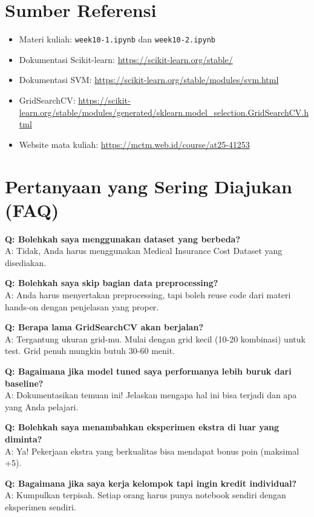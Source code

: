 \documentclass[12pt,a4paper]{article}
\begin{document}
\section{Sumber Referensi}

\begin{itemize}
    \item Materi kuliah: \texttt{week10-1.ipynb} dan \texttt{week10-2.ipynb}
    \item Dokumentasi Scikit-learn: \url{https://scikit-learn.org/stable/}
    \item Dokumentasi SVM: \url{https://scikit-learn.org/stable/modules/svm.html}
    \item GridSearchCV: \url{https://scikit-learn.org/stable/modules/generated/sklearn.model_selection.GridSearchCV.html}
    \item Website mata kuliah: \url{https://mctm.web.id/course/at25-41253}
\end{itemize}

\section{Pertanyaan yang Sering Diajukan (FAQ)}

\textbf{Q: Bolehkah saya menggunakan dataset yang berbeda?} \\
A: Tidak, Anda harus menggunakan Medical Insurance Cost Dataset yang disediakan.

\textbf{Q: Bolehkah saya skip bagian data preprocessing?} \\
A: Anda harus menyertakan preprocessing, tapi boleh reuse code dari materi hands-on dengan penjelasan yang proper.

\textbf{Q: Berapa lama GridSearchCV akan berjalan?} \\
A: Tergantung ukuran grid-mu. Mulai dengan grid kecil (10-20 kombinasi) untuk test. Grid penuh mungkin butuh 30-60 menit.

\textbf{Q: Bagaimana jika model tuned saya performanya lebih buruk dari baseline?} \\
A: Dokumentasikan temuan ini! Jelaskan mengapa hal ini bisa terjadi dan apa yang Anda pelajari.

\textbf{Q: Bolehkah saya menambahkan eksperimen ekstra di luar yang diminta?} \\
A: Ya! Pekerjaan ekstra yang berkualitas bisa mendapat bonus poin (maksimal +5).

\textbf{Q: Bagaimana jika saya kerja kelompok tapi ingin kredit individual?} \\
A: Kumpulkan terpisah. Setiap orang harus punya notebook sendiri dengan eksperimen sendiri.
\end{document}
